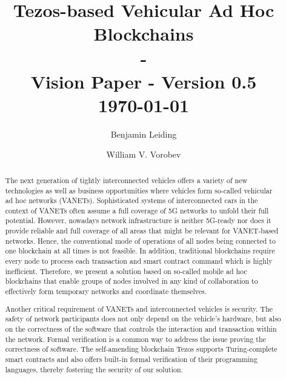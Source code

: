 \documentclass{llncs}
\begin{document}
	{
	\title{Tezos-based Vehicular Ad Hoc Blockchains\\ - \\ \small Vision Paper - Version 0.5\\\small \today}
	
	\author{Benjamin Leiding \and William V. Vorobev}
	
	
	\maketitle


	\begin{abstract}


		The next generation of tightly interconnected vehicles offers a variety of new technologies as well as business opportunities where vehicles form so-called vehicular ad hoc networks (VANETs). Sophisticated systems of interconnected cars in the context of VANETs often assume a full coverage of 5G networks to unfold their full potential. However, nowadays network infrastructure is neither 5G-ready nor does it provide reliable and full coverage of all areas that might be relevant for VANET-based networks. Hence, the conventional mode of operations of all nodes being connected to one blockchain at all times is not feasible. In addition, traditional blockchains require every node to process each transaction and smart contract command which is highly inefficient. Therefore, we present a solution based on so-called mobile ad hoc blockchains that enable groups of nodes involved in any kind of collaboration to effectively form temporary networks and coordinate themselves. 

		Another critical requirement of VANETs and interconnected vehicles is security. The safety of network participants does not only depend on the vehicle's hardware, but also on the correctness of the software that controls the interaction and transaction within the network. Formal verification is a common way to address the issue proving the correctness of software. The self-amending blockchain Tezos supports Turing-complete smart contracts and also offers built-in formal verification of their programming languages, thereby fostering the security of our solution.


\end{abstract}}
\end{document}

